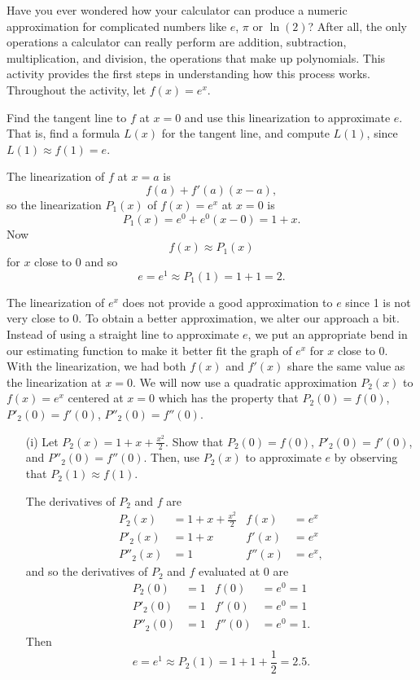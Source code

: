 \begin{pa} \label{PA:8.3}
Have you ever wondered how your calculator can produce a numeric approximation for complicated numbers like $e$, $\pi$ or $\ln(2)$? After all, the only operations a calculator can really perform are addition, subtraction, multiplication, and division, the operations that make up polynomials. This activity provides the first steps in understanding how this process works. Throughout the activity, let $f(x) = e^x$.

\ba
\item Find the tangent line to $f$ at $x=0$ and use this linearization to approximate $e$.  That is, find a formula $L(x)$ for the tangent line, and compute $L(1)$, since $L(1) \approx f(1) = e$.

\begin{activitySolution}

The linearization of $f$ at $x=a$ is
\[f(a) + f'(a)(x-a),\]
so the linearization $P_1(x)$ of $f(x) = e^x$ at $x=0$ is
\[P_1(x) = e^0 + e^0(x-0) = 1+x.\]
Now
\[f(x) \approx P_1(x)\]
for $x$ close to $0$ and so
\[e = e^1 \approx P_1(1) = 1+1 = 2.\]

\end{activitySolution}

\item The linearization of $e^x$ does not provide a good approximation to $e$ since 1 is not very close to 0. To obtain a better approximation, we alter our approach a bit. Instead of using a straight line to approximate $e$, we put an appropriate bend in our estimating function to make it better fit the graph of $e^x$ for $x$ close to 0. With the linearization, we had both $f(x)$ and $f'(x)$ share the same value as the linearization at $x=0$. We will now use a quadratic approximation $P_2(x)$ to $f(x) = e^x$ centered at $x=0$ which has the property that $P_2(0) = f(0)$, $P'_2(0) = f'(0)$,  $P''_2(0) = f''(0)$.

     \begin{itemize}
     \item[(i)] Let $P_2(x) = 1+x+\frac{x^2}{2}$. Show that $P_2(0) = f(0)$, $P'_2(0) = f'(0)$, and $P''_2(0) = f''(0)$. Then, use $P_2(x)$ to approximate $e$ by observing that $P_2(1) \approx f(1)$.

\begin{activitySolution}

The derivatives of $P_2$ and $f$ are
\begin{align*}
P_2(x) &= 1+x+\frac{x^2}{2} & f(x) &= e^x \\
P'_2(x) &= 1 + x & f'(x) &= e^x \\
P''_2(x) &= 1 & f''(x) &= e^x,
\end{align*}
and so the derivatives of $P_2$ and $f$ evaluated at 0 are
\begin{align*}
P_2(0) &= 1 & f(0) &= e^0 = 1 \\
P'_2(0) &= 1 & f'(0) &= e^0 = 1 \\
P''_2(0) &= 1 & f''(0) &= e^0 = 1.
\end{align*}
Then
\[e = e^1 \approx P_2(1) = 1 + 1 + \frac{1}{2} = 2.5.\]


\end{activitySolution}
\end{itemize}
\end{pa}
